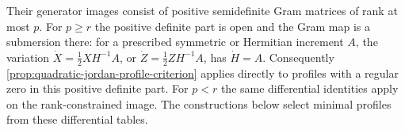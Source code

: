 Their generator images consist of positive semidefinite Gram matrices
of rank at most $p$. For $p\geq r$ the positive definite part is
open and the Gram map is a submersion there: for a prescribed
symmetric or Hermitian increment $A$, the variation
$\dot X=\tfrac12 XH^{-1}A$, or
$\dot Z=\tfrac12 ZH^{-1}A$, has $\dot H=A$.
Consequently \cref{prop:quadratic-jordan-profile-criterion} applies
directly to profiles with a regular zero in this positive definite
part. For $p<r$ the same differential identities apply on the
rank-constrained image. The constructions below select minimal
profiles from these differential tables.
